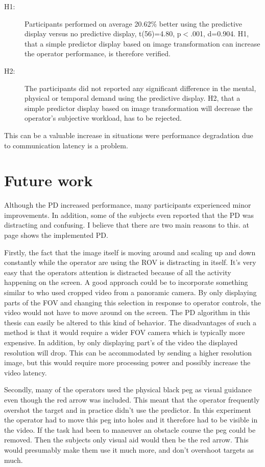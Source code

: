 \begin{description}
\item[H1:] Participants performed on average 20.62\% better using the predictive display versus no predictive display, t(56)=4.80, p$<$.001, d=0.904. H1, that a simple predictor display based on image transformation can increase the operator performance, is therefore verified.

\item[H2:] The participants did not reported any significant difference in the mental, physical or temporal demand using the predictive display. H2, that a simple predictor display based on image transformation will decrease the operator's subjective workload, has to be rejected. 
\end{description}


This can be a valuable increase in situations were performance degradation due to communication latency is a problem.

\section{Future work}

Although the PD increased performance, many participants experienced minor improvements. In addition, some of the subjects even reported that the PD was distracting and confusing. I believe that there are two main reasons to this.  at page \pageref{predictorvis} shows the implemented PD.

Firstly, the fact that the image itself is moving around and scaling up and down constantly while the operator are using the ROV is distracting in itself. It's very easy that the operators attention is distracted because of all the activity happening on the screen. A good approach could be to incorporate something similar to \citep{Baldwin1999} who used cropped video from a panoramic camera. By only displaying parts of the FOV and changing this selection in response to operator controls, the video would not have to move around on the screen. The PD algorithm in this thesis can easily be altered to this kind of behavior. The disadvantages of such a method is that it would require a wider FOV camera which is typically more expensive. In addition, by only displaying part's of the video the displayed resolution will drop. This can be accommodated by sending a higher resolution image, but this would require more processing power and possibly increase the video latency.

Secondly, many of the operators used the physical black peg as visual guidance even though the red arrow was included. This meant that the operator frequently overshot the target and in practice didn't use the predictor. In this experiment the operator had to move this peg into holes and it therefore had to be visible in the video. If the task had been to maneuver an obstacle course the peg could be removed. Then the subjects only visual aid would then be the red arrow. This would presumably make them use it much more, and don't overshoot targets as much.

